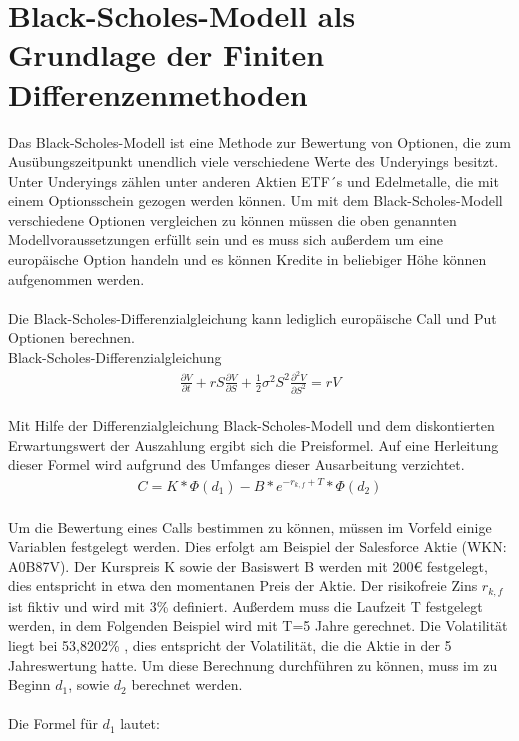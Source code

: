 \documentclass[12pt,titlepage]{article}
\begin{document}
\section{Black-Scholes-Modell als Grundlage der Finiten Differenzenmethoden}
Das Black-Scholes-Modell ist eine Methode zur Bewertung von Optionen, die zum Ausübungszeitpunkt unendlich viele verschiedene Werte des Underyings besitzt. Unter Underyings zählen unter anderen Aktien ETF´s und Edelmetalle, die mit einem Optionsschein gezogen werden können. Um mit dem Black-Scholes-Modell verschiedene Optionen vergleichen zu können müssen die oben genannten Modellvoraussetzungen erfüllt sein und es muss sich außerdem um eine europäische Option handeln und es können Kredite in beliebiger Höhe können aufgenommen werden.
\\\\
Die Black-Scholes-Differenzialgleichung kann lediglich europäische Call und Put Optionen berechnen.\\
Black-Scholes-Differenzialgleichung\\
\begin{align*}
\frac{\partial V}{\partial t}+rS \frac{\partial V}{\partial S}+ \frac{1}{2} \sigma ^2 S^2 \frac{\partial ^2 V}{\partial S^2}=rV
\end{align*}\\
Mit Hilfe der Differenzialgleichung 
Black-Scholes-Modell und dem diskontierten Erwartungswert der Auszahlung ergibt sich die Preisformel. Auf eine Herleitung dieser Formel wird aufgrund des Umfanges dieser Ausarbeitung verzichtet.
\\
\begin{align*}
C=K*\Phi (d_1)-B*e^{-r_{k,f}+T}* \Phi (d_2)
\end{align*}
\\
Um die Bewertung eines Calls bestimmen zu können, müssen im Vorfeld einige Variablen festgelegt werden. Dies erfolgt am Beispiel der Salesforce Aktie (WKN: A0B87V). Der Kurspreis K sowie der Basiswert B werden mit 200€ festgelegt, dies entspricht in etwa den momentanen Preis der Aktie. Der risikofreie Zins $r_{k,f}$ ist fiktiv und wird mit 3\%  definiert. Außerdem muss die Laufzeit T festgelegt werden, in dem Folgenden Beispiel wird mit T=5 Jahre gerechnet. Die Volatilität liegt bei 53,8202\% , dies entspricht der Volatilität, die die Aktie in der 5 Jahreswertung hatte. Um diese Berechnung durchführen zu können, muss im zu Beginn $d_1$, sowie $d_2$ berechnet werden.\\\\
Die Formel für $d_1$ lautet: \\
\end{document}
